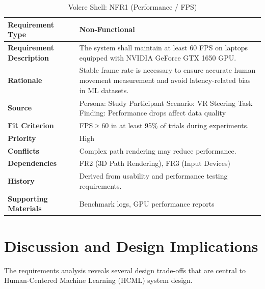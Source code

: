 \documentclass[sigconf]{acmart}
\begin{document}
\begin{table}[h!]
\centering
\caption{Volere Shell: NFR1 (Performance / FPS)}
\begin{tabular}{|p{3.5cm}|p{4.5cm}|}
\hline
\textbf{Requirement Type} & Non-Functional \\ \hline

\textbf{Requirement Description} &
The system shall maintain at least 60 FPS on laptops equipped with NVIDIA GeForce GTX 1650 GPU. \\ \hline

\textbf{Rationale} &
Stable frame rate is necessary to ensure accurate human movement measurement and avoid latency-related bias in ML datasets. \\ \hline

\textbf{Source} &
Persona: Study Participant \newline
Scenario: VR Steering Task \newline
Finding: Performance drops affect data quality \\ \hline

\textbf{Fit Criterion} &
FPS ≥ 60 in at least 95\% of trials during experiments. \\ \hline

\textbf{Priority} &
High \\ \hline

\textbf{Conflicts} &
Complex path rendering may reduce performance. \\ \hline

\textbf{Dependencies} &
FR2 (3D Path Rendering), FR3 (Input Devices) \\ \hline

\textbf{History} &
Derived from usability and performance testing requirements. \\ \hline

\textbf{Supporting Materials} &
Benchmark logs, GPU performance reports \\ \hline
\end{tabular}
\end{table}

\newpage


\section{Discussion and Design Implications}

The requirements analysis reveals several design trade-offs that are central to Human-Centered Machine Learning (HCML) system design.
\end{document}
